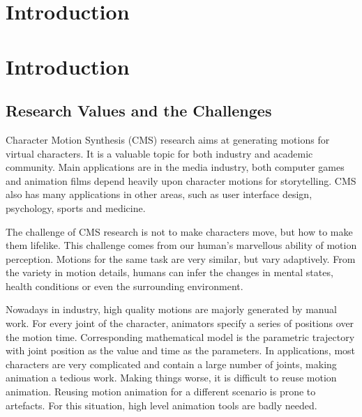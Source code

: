 \chapter{Introduction}
\ifpdf
    \graphicspath{{Introduction/IntroductionFigs/PNG/}{Introduction/IntroductionFigs/PDF/}{Introduction/IntroductionFigs/}}
\else
    \graphicspath{{Introduction/IntroductionFigs/EPS/}{Introduction/IntroductionFigs/}}
\fi

\chapter{Introduction}
\section{Research Values and the Challenges}
Character Motion Synthesis (CMS) research aims at generating motions for virtual characters.
It is a valuable topic for both industry and academic community. 
Main applications are in the media industry, both computer games and animation films depend heavily upon character motions for storytelling.  
CMS also has many applications in other areas, such as user interface design, psychology, sports and medicine.

The challenge of CMS research is not to make characters move, but how to make them lifelike. 
This challenge comes from our human's marvellous ability of motion perception. 
Motions for the same task are very similar, but vary adaptively.
From the variety in motion details, humans can infer the changes in mental states, health conditions or even the surrounding environment. 

Nowadays in industry, high quality motions are majorly generated by manual work. 
For every joint of the character, animators specify a series of positions over the motion time.
Corresponding mathematical model is the parametric trajectory with joint position as the value and time as the parameters.
In applications, most characters are very complicated and contain a large number of joints, making animation a tedious work.
Making things worse, it is difficult to reuse motion animation.
Reusing motion animation for a different scenario is prone to artefacts.
For this situation, high level animation tools are badly needed. 

